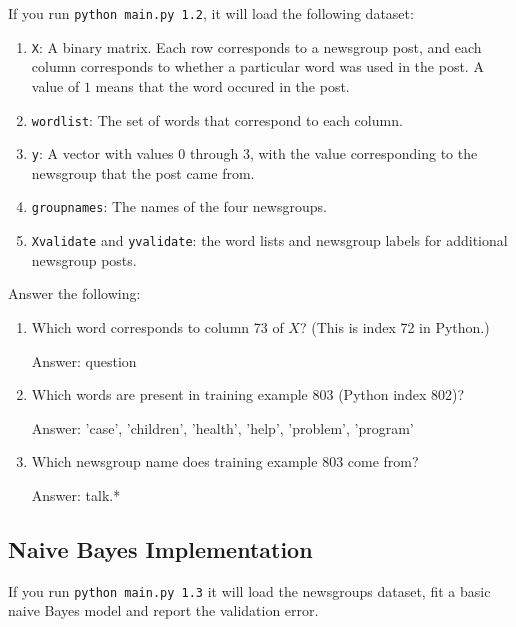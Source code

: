 \documentclass{article}
\def\ans#1{\par\gre{Answer: #1}}
\def\blu#1{{\color{blu}#1}}
\def\gre#1{{\color{gre}#1}}
\let\ask\blu
\begin{document}
  If you run \texttt{python main.py 1.2}, it will load the following dataset:
    \begin{enumerate}
        \item \texttt{X}: A binary matrix. Each row corresponds to a newsgroup post, and each column corresponds to whether a particular word was used in the post. A value of $1$ means that the word occured in the post.
        \item \texttt{wordlist}: The set of words that correspond to each column.
        \item \texttt{y}: A vector with values $0$ through $3$, with the value corresponding to the newsgroup that the post came from.
        \item \texttt{groupnames}: The names of the four newsgroups.
        \item \texttt{Xvalidate} and \texttt{yvalidate}: the word lists and newsgroup labels for additional newsgroup posts.
    \end{enumerate}
    \ask{Answer the following}:
    \begin{enumerate}
        \item Which word corresponds to column 73 of $X$? (This is index 72 in Python.)
        \ans{question}
        \item Which words are present in training example 803 (Python index 802)?
        \ans{'case', 'children', 'health', 'help', 'problem', 'program'}
        \item Which newsgroup name does training example 803 come from?
        \ans{talk.*}
    \end{enumerate}

\pagebreak

\subsection{Naive Bayes Implementation}

   If you run \texttt{python main.py 1.3}
    it will load the newsgroups dataset, fit a basic naive Bayes model and report the validation error.
\end{document}
